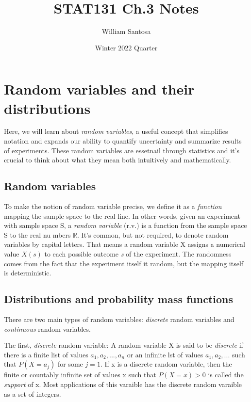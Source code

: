 \documentclass[12pt, letterpaper]{article}
\title{STAT131 Ch.3 Notes}
\author{William Santosa}
\date{Winter 2022 Quarter}
\begin{document}
\maketitle

\section{Random variables and their distributions}

Here, we will learn about \textit{random variables}, a useful concept that simplifies notation and expands our ability to quantify uncertainty and summarize results of experiments. These random variables are essetnail through statistics and it's crucial to think about what they mean both intuitively and mathematically.

\subsection{Random variables}

To make the notion of random variable precise, we define it as a \textit{function} mapping the sample space to the real line. In other words, given an experiment with sample space S, a \textit{random variable} (r.v.) is a function from the sample space S to the real nu mbers \(\mathbb{R}\). It's common, but not required, to denote random variables by capital letters.
That means a random variable X assigns a numerical value \(X(s)\) to each possible outcome \textit{s} of the experiment. The randomness comes from the fact that the experiment itself it random, but the mapping itself is deterministic. 

\subsection{Distributions and probability mass functions}

There are two main types of random variables: \textit{discrete} random variables and \textit{continuous} random variables.

The first, \textit{discrete} random variable: A random variable X is said to be \textit{discrete} if there is a finite list of values \(a_1, a_2, ..., a_n\) or an infinite lst of values \(a_1, a_2, ...\) such that \(P(X = a_j)\) for some \(j = 1\). If x is a discrete random variable, then the finite or countably infinite set of values x such that \(P(X = x) > 0\) is called the \textit{support} of x. Most applications of this varaible has the discrete random varaible as a set of integers.
\end{document}
